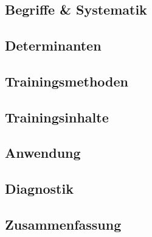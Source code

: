 \section{}

\subsection{Begriffe \& Systematik}

\subsection{Determinanten}

\subsection{Trainingsmethoden}

\subsection{Trainingsinhalte}

\subsection{Anwendung}

\subsection{Diagnostik}

\subsection{Zusammenfassung}
